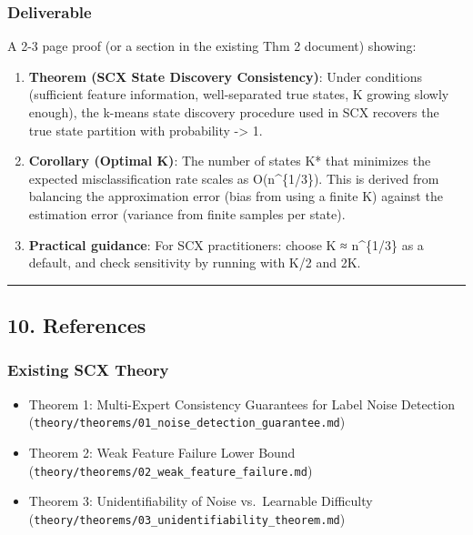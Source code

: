 \documentclass[
  12pt,
]{ctexart}
\providecommand{\tightlist}{%
  \setlength{\itemsep}{0pt}\setlength{\parskip}{0pt}}
\begin{document}
\subsubsection{Deliverable}\label{deliverable}

A 2-3 page proof (or a section in the existing Thm 2 document) showing:

\begin{enumerate}
\def\labelenumi{\arabic{enumi}.}
\item
  \textbf{Theorem (SCX State Discovery Consistency)}: Under conditions
  (sufficient feature information, well-separated true states, K growing
  slowly enough), the k-means state discovery procedure used in SCX
  recovers the true state partition with probability -\textgreater{} 1.
\item
  \textbf{Corollary (Optimal K)}: The number of states K* that minimizes
  the expected misclassification rate scales as O(n\^{}\{1/3\}). This is
  derived from balancing the approximation error (bias from using a
  finite K) against the estimation error (variance from finite samples
  per state).
\item
  \textbf{Practical guidance}: For SCX practitioners: choose K ≈
  n\^{}\{1/3\} as a default, and check sensitivity by running with K/2
  and 2K.
\end{enumerate}

\begin{center}\rule{0.5\linewidth}{0.5pt}\end{center}

\subsection{10. References}\label{references}

\subsubsection{Existing SCX Theory}\label{existing-scx-theory}

\begin{itemize}
\tightlist
\item
  Theorem 1: Multi-Expert Consistency Guarantees for Label Noise
  Detection
  (\texttt{theory/theorems/01\_noise\_detection\_guarantee.md})
\item
  Theorem 2: Weak Feature Failure Lower Bound
  (\texttt{theory/theorems/02\_weak\_feature\_failure.md})
\item
  Theorem 3: Unidentifiability of Noise vs.~Learnable Difficulty
  (\texttt{theory/theorems/03\_unidentifiability\_theorem.md})
\end{itemize}
\end{document}
